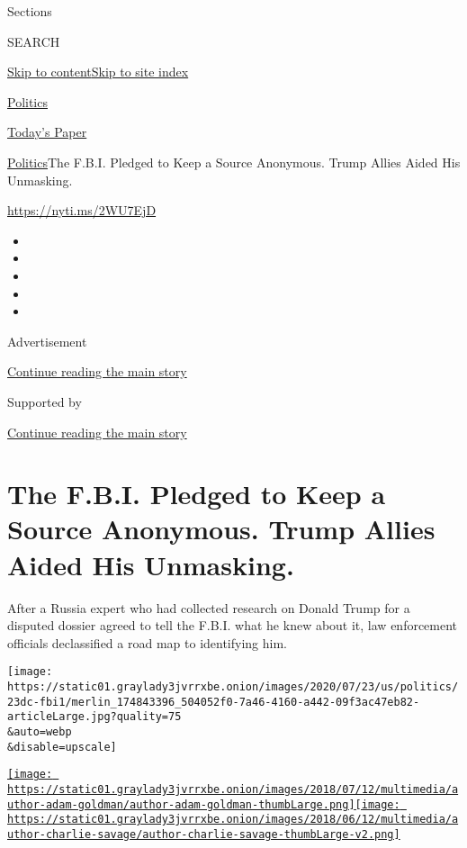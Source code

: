 Sections

SEARCH

\protect\hyperlink{site-content}{Skip to
content}\protect\hyperlink{site-index}{Skip to site index}

\href{https://www.nytimes3xbfgragh.onion/section/politics}{Politics}

\href{https://myaccount.nytimes3xbfgragh.onion/auth/login?response_type=cookie\&client_id=vi}{}

\href{https://www.nytimes3xbfgragh.onion/section/todayspaper}{Today's
Paper}

\href{/section/politics}{Politics}\textbar{}The F.B.I. Pledged to Keep a
Source Anonymous. Trump Allies Aided His Unmasking.

\url{https://nyti.ms/2WU7EjD}

\begin{itemize}
\item
\item
\item
\item
\item
\end{itemize}

Advertisement

\protect\hyperlink{after-top}{Continue reading the main story}

Supported by

\protect\hyperlink{after-sponsor}{Continue reading the main story}

\hypertarget{the-fbi-pledged-to-keep-a-source-anonymous-trump-allies-aided-his-unmasking}{%
\section{The F.B.I. Pledged to Keep a Source Anonymous. Trump Allies
Aided His
Unmasking.}\label{the-fbi-pledged-to-keep-a-source-anonymous-trump-allies-aided-his-unmasking}}

After a Russia expert who had collected research on Donald Trump for a
disputed dossier agreed to tell the F.B.I. what he knew about it, law
enforcement officials declassified a road map to identifying him.

\texttt{[image: https://static01.graylady3jvrrxbe.onion/images/2020/07/23/us/politics/23dc-fbi1/merlin\_174843396\_504052f0-7a46-4160-a442-09f3ac47eb82-articleLarge.jpg?quality=75\\\&auto=webp\\\&disable=upscale]}

\href{https://www.nytimes3xbfgragh.onion/by/adam-goldman}{\texttt{[image: https://static01.graylady3jvrrxbe.onion/images/2018/07/12/multimedia/author-adam-goldman/author-adam-goldman-thumbLarge.png]}}\href{https://www.nytimes3xbfgragh.onion/by/charlie-savage}{\texttt{[image: https://static01.graylady3jvrrxbe.onion/images/2018/06/12/multimedia/author-charlie-savage/author-charlie-savage-thumbLarge-v2.png]}}


